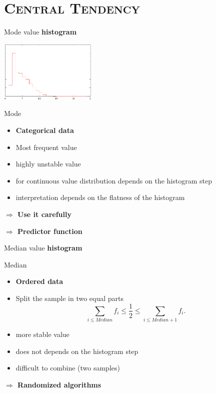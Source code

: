 \documentclass[xcolor=x11names,compress,8pt,
]{beamer}
\def\leq{\leqslant}
\renewcommand{\(}{\begin{columns}}
\renewcommand{\)}{\end{columns}}
\newcommand{\<}[1]{\begin{column}{#1}}
\renewcommand{\>}{\end{column}}
\begin{document}
\section[{\scshape Central Tendency}]{{\scshape Central Tendency}}
\begin{frame}{Mode value}
{\bf histogram}
\begin{center}
\includegraphics[width=4.6cm]{histogramme.pdf}
\end{center}
\begin{block}{Mode}
\begin{itemize}
\item  {\textcolor{Green4}{\bf Categorical data}}
\item Most frequent value
\item highly unstable value
\item for continuous value distribution depends on the histogram step
\item interpretation depends on the flatness of the histogram
\end{itemize}
\alert{\bf $\Longrightarrow$ Use it carefully} 

\alert{\bf $\Longrightarrow$ Predictor function} 

\end{block}
\end{frame}
\begin{frame}{Median value}
{\bf histogram}
\begin{center}
\end{center}
\begin{block}{Median}
\begin{itemize}
\item {\textcolor{Green4}{\bf Ordered data}}
\item Split the sample in two equal parts 
\[
\sum_{i\leq Median}f_i \leq \frac 1 2 \leq \sum_{i\leq Median+1}f_i .\]
\item more stable value
\item does not depends on the histogram step 
\item difficult to combine (two samples)
\end{itemize}


\alert{\bf $\Longrightarrow$ Randomized algorithms} 

\end{block}
\end{frame}
\end{document}
